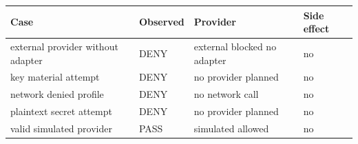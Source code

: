 \begin{tabularx}{\textwidth}{@{}XXXX@{}}
\toprule
Case & Observed & Provider & Side effect \\
\midrule
external provider without adapter & DENY & external blocked no adapter & no \\
key material attempt & DENY & no provider planned & no \\
network denied profile & DENY & no network call & no \\
plaintext secret attempt & DENY & no provider planned & no \\
valid simulated provider & PASS & simulated allowed & no \\
\bottomrule
\end{tabularx}

